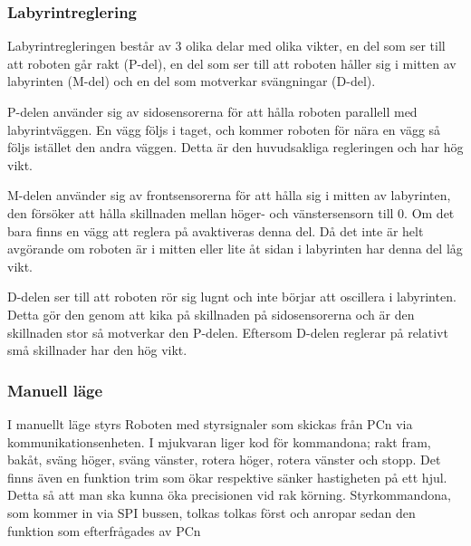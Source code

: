 \subsubsection{Labyrintreglering}
Labyrintregleringen består av 3 olika delar med olika vikter,
en del som ser till att roboten går rakt (P-del), en del som ser till att
roboten håller sig i mitten av labyrinten (M-del) och en del som motverkar
svängningar (D-del).


P-delen använder sig av sidosensorerna för att hålla roboten parallell med
labyrintväggen. En vägg följs i taget, och kommer roboten för nära en vägg så
följs istället den andra väggen. Detta är den huvudsakliga regleringen och har
hög vikt.


M-delen använder sig av frontsensorerna för att hålla sig i mitten av
labyrinten, den försöker att hålla skillnaden mellan höger- och vänstersensorn
till 0. Om det bara finns en vägg att reglera på avaktiveras denna del. Då det
inte är helt avgörande om roboten är i mitten eller lite åt sidan i labyrinten
har denna del låg vikt.


D-delen ser till att roboten rör sig lugnt och inte börjar att oscillera i
labyrinten. Detta gör den genom att kika på skillnaden på sidosensorerna och är
den skillnaden stor så motverkar den P-delen. Eftersom D-delen reglerar på
relativt små skillnader har den hög vikt.

\label{reglering}

\subsubsection{Manuell läge}

I manuellt läge styrs Roboten med styrsignaler som skickas från PCn via 
kommunikationsenheten. I mjukvaran liger kod för kommandona; rakt 
fram, bakåt, sväng höger, sväng vänster, rotera höger, rotera vänster
och stopp. Det finns även en funktion trim som ökar respektive sänker 
hastigheten på ett hjul. Detta så att man ska kunna öka precisionen vid 
rak körning. Styrkommandona, som kommer in via SPI bussen, tolkas 
tolkas först och anropar sedan den funktion som efterfrågades av PCn



	

